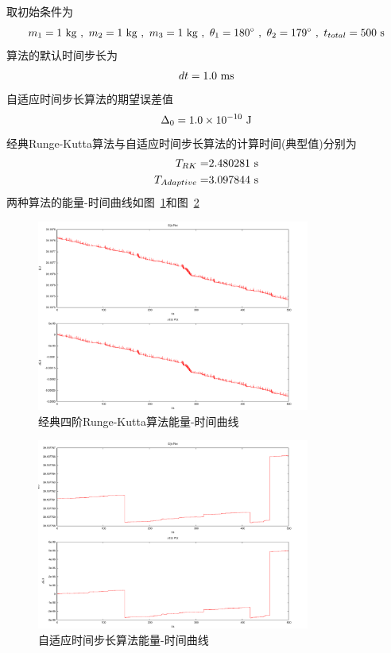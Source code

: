 \documentclass[a4paper,12pt,titlepage]{article}
\begin{document}
取初始条件为
\begin{equation}
	m_1=1~\mathrm{kg} ~,~ m_2=1~\mathrm{kg} ~,~ m_3=1~\mathrm{kg} ~,~ \theta_1=180^{\circ} ~,~ \theta_2=179^{\circ} ~,~ t_{total}=500 ~\mathrm{s}\notag
\end{equation}
算法的默认时间步长为
\begin{equation}
	dt=1.0 ~\mathrm{ms}\notag
\end{equation}
自适应时间步长算法的期望误差值
\begin{equation}
	\Delta_0=1.0\times 10^{-10} ~\mathrm{J}\notag
\end{equation}
经典Runge-Kutta算法与自适应时间步长算法的计算时间(典型值)分别为
\begin{align}
	T_{RK}=&2.480281 ~\mathrm{s} \notag \\
	T_{Adaptive}=&3.097844 ~\mathrm{s}\notag
\end{align}
两种算法的能量-时间曲线如图~\ref{fig:RKE_4}和图~\ref{fig:RKAE_4}
\begin{figure}[H]
\centering
\includegraphics[width=0.8\textwidth]{./RKE_4.pdf}
\caption[Caption for LOF]{经典四阶Runge-Kutta算法能量-时间曲线}
\label{fig:RKE_4}
\end{figure}
\begin{figure}[H]
\centering
\includegraphics[width=0.8\textwidth]{./RKAE_4.pdf}
\caption[Caption for LOF]{自适应时间步长算法能量-时间曲线}
\label{fig:RKAE_4}
\end{figure}
\end{document}
